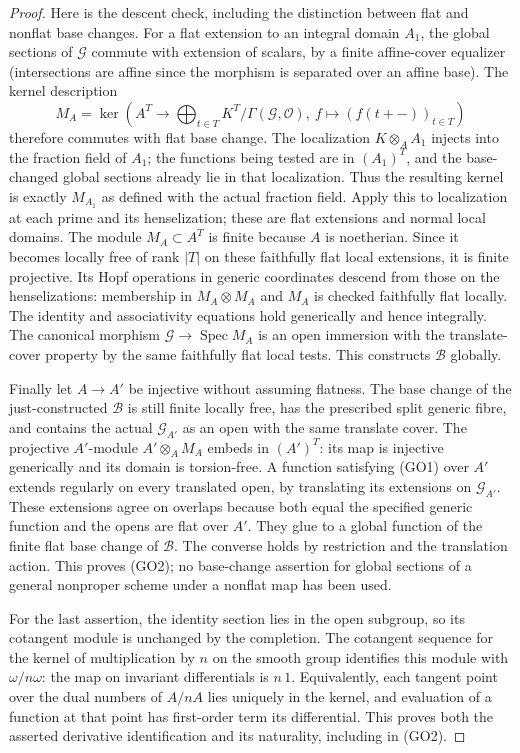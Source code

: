 \begin{proof}
Here is the descent check, including the distinction between
flat and nonflat base changes. For a flat extension to an
integral domain \(A_1\), the global sections of
\(\mathscr G\) commute with extension of scalars, by a finite
affine-cover equalizer (intersections are affine since the
morphism is separated over an affine base). The kernel
description
\[
 M_A=\ker\left(A^T\longrightarrow
       \bigoplus_{t\in T} K^T/\Gamma(\mathscr G,\mathcal O),
                   \ f\longmapsto(f(t+{-}))_{t\in T}\right)
\]
therefore commutes with flat base change. The localization
\(K\otimes_A A_1\) injects into the fraction field of \(A_1\);
the functions being tested are in \((A_1)^T\), and the
base-changed global sections already lie in that
localization. Thus the resulting kernel is exactly
\(M_{A_1}\) as defined with the actual fraction field.
Apply this to localization at each prime and its
henselization; these are flat extensions and normal local
domains. The module \(M_A\subset A^T\) is finite because
\(A\) is noetherian. Since it becomes locally free of rank
\(|T|\) on these faithfully flat local extensions, it is
finite projective. Its Hopf operations in generic
coordinates descend from those on the henselizations:
membership in \(M_A\otimes M_A\) and \(M_A\) is checked
faithfully flat locally. The identity and associativity
equations hold generically and hence integrally. The
canonical morphism \(\mathscr G\to\operatorname{Spec}M_A\)
is an open immersion with the translate-cover property by
the same faithfully flat local tests. This constructs
\(\mathscr B\) globally.

Finally let \(A\to A'\) be injective without assuming
flatness. The base change of the just-constructed
\(\mathscr B\) is still finite locally free, has the
prescribed split generic fibre, and contains the actual
\(\mathscr G_{A'}\) as an open with the same translate cover.
The projective \(A'\)-module \(A'\otimes_A M_A\) embeds in
\((A')^T\): its map is injective generically and its domain
is torsion-free. A function satisfying (GO1) over \(A'\)
extends regularly on every translated open, by translating
its extensions on \(\mathscr G_{A'}\). These extensions agree
on overlaps because both equal the specified generic function
and the opens are flat over \(A'\). They glue to a global
function of the finite flat base change of \(\mathscr B\).
The converse holds by restriction and the translation
action. This proves (GO2); no base-change assertion for
global sections of a general nonproper scheme under a
nonflat map has been used.

For the last assertion, the identity section lies in the
open subgroup, so its cotangent module is unchanged by the
completion. The cotangent sequence for the kernel of
multiplication by \(n\) on the smooth group identifies this
module with \(\omega/n\omega\): the map on invariant
differentials is \(n\,1\).
Equivalently, each tangent point over the dual numbers of
\(A/nA\) lies uniquely in the kernel, and evaluation of a
function at that point has first-order term its differential.
This proves both the asserted derivative identification and
its naturality, including in (GO2).
\end{proof}

